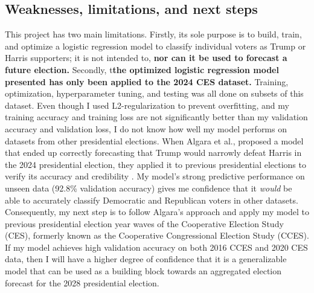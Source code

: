 \documentclass[letter]{article}
\begin{document}
\subsection{Weaknesses, limitations, and next steps}
This project has two main limitations. Firstly, its sole purpose is to build, train, and optimize a logistic regression model to classify individual voters as Trump or Harris supporters; it is not intended to,\textbf{ nor can it be used to forecast a future election.} Secondly, t\textbf{the optimized logistic regression model presented has only been applied to the 2024 CES dataset.} Training, optimization, hyperparameter tuning, and testing was all done on subsets of this dataset. Even though I used L2-regularization to prevent overfitting, and my training accuracy and training loss are not significantly better than my validation accuracy and validation loss, I do not know how well my model performs on datasets from other presidential elections. When Algara et al., proposed a model that ended up correctly forecasting that Trump would narrowly defeat Harris in the 2024 presidential election, they applied it to previous presidential elections to verify its accuracy and credibility \cite{algara}. My model’s strong predictive performance on unseen data (92.8\% validation accuracy) gives me confidence that it \textit{would} be able to accurately classify Democratic and Republican voters in other datasets. Consequently, my next step is to follow Algara’s approach and apply my model to previous presidential election year waves of the Cooperative Election Study (CES), formerly known as the Cooperative Congressional Election Study (CCES). If my model achieves high validation accuracy on both 2016 CCES and 2020 CES data, then I will have a higher degree of confidence that it is a generalizable model that can be used as a building block towards an aggregated election forecast for the 2028 presidential election. \\
\\
\end{document}
